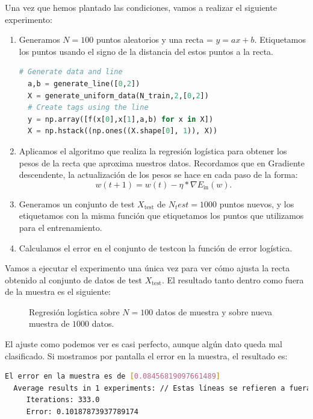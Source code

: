 \documentclass[12pt]{article}
\begin{document}
{Una vez que hemos plantado las condiciones, vamos a realizar el siguiente experimento: 
\begin{enumerate}
\item Generamos $N = 100$ puntos aleatorios y una recta = $y = ax + b$. Etiquetamos los puntos usando el signo de la distancia del estos puntos a la recta.

\begin{lstlisting}[language=Python]
  # Generate data and line
  a,b = generate_line([0,2])
  X = generate_uniform_data(N_train,2,[0,2])
  # Create tags using the line
  y = np.array([f(x[0],x[1],a,b) for x in X])
  X = np.hstack((np.ones((X.shape[0], 1)), X))
\end{lstlisting}

\item Aplicamos el algoritmo  que realiza la regresión logística para obtener los pesos de la recta que aproxima nuestros datos. Recordamos que en Gradiente descendente, la actualización de los pesos se hace en cada paso de la forma:
$$
w(t+1) = w(t) - \eta * \nabla E_{\operatorname{in}}(w).
$$

\item Generamos un conjunto de test $X_{\operatorname{test}}$ de $N_test = 1000$ puntos nuevos, y los etiquetamos con la misma función que etiquetamos los puntos que utilizamos para el entrenamiento.

\item Calculamos el error en el conjunto de testcon la función de error logística. 

\end{enumerate}

Vamos a ejecutar el experimento una única vez para ver cómo ajusta la recta obtenido al conjunto de datos de test $X_{\operatorname{test}}$. El resultado  tanto dentro como fuera de la muestra es el siguiente:
\begin{figure}[H]
  \centering
  \qquad
  \caption{Regresión logística sobre $N=100$ datos de muestra y sobre nueva muestra de $1000$ datos. }
  \label{fig:myfig:2}
\end{figure}
El ajuste como podemos ver es casi perfecto, aunque algún dato queda mal clasificado. Si mostramos por pantalla el error en la muestra, el resultado es:
\begin{lstlisting}[language=bash]
  El error en la muestra es de [0.08456819097661489]
  Average results in 1 experiments: // Estas líneas se refieren a fuera de la muestra
	 Iterations: 333.0
	 Error: 0.10187873937789174
\end{lstlisting}

}
\end{document}
